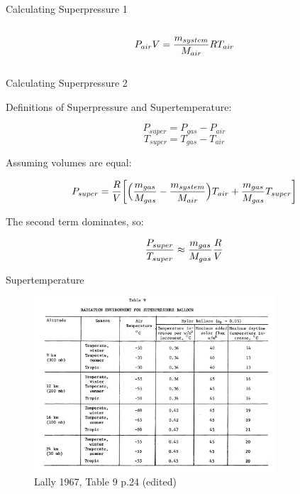 \documentclass{beamer}
\begin{document}
\begin{frame}{Calculating Superpressure 1}
\begin{columns}
\begin{column}{0.5\textwidth}
      \[
        P_{air}V = {m_{system}\over{M_{air}}} R T_{air}
      \]
    \end{column}
  \end{columns}


\end{frame}

\begin{frame}{Calculating Superpressure 2}

  Definitions of Superpressure and Supertemperature:

  \[
    P_{super} = P_{gas} - P_{air}
  \]
  \[
    T_{super} = T_{gas} - T_{air}
  \]

  Assuming volumes are equal:

  \[
    P_{super} = { {R\over{V}} \bigg[ \Big( {m_{gas}\over{M_{gas}}} - {m_{system}\over{M_{air}}} \Big)T_{air}   +  {{m_{gas}}\over{M_{gas}}}T_{super} \bigg]}
  \]


  The second term dominates, so:

  \[
    {P_{super}\over{T_{super}}} \approx   {{m_{gas}}\over{M_{gas}}}{R\over{V}}
  \]


\end{frame}



\begin{frame}{Supertemperature}

  \begin{figure}[!ht]
    \centering
    \includegraphics[width=0.8\textwidth]{lally_19_table_9.png}
    \caption{Lally 1967, Table 9 p.24 (edited)}
  \end{figure}


\end{frame}
\end{document}
